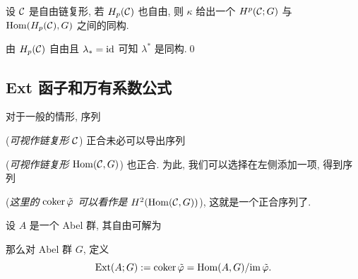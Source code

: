 \begin{Corollary}
	设 $ \mathcal{C} $ 是自由链复形, 若 $ H_p(\mathcal{C}) $ 也自由, 则 $ \kappa $ 给出一个 $ H^p(\mathcal{C};G) $ 与 $ \mathrm{Hom}(H_p(\mathcal{C}),G) $ 之间的同构.
\end{Corollary}
\begin{Proof}
	由 $ H_p(\mathcal{C}) $ 自由且 $ \lambda_*=\mathrm{id} $ 可知 $ \lambda^* $ 是同构.\qed
\end{Proof}

\subsection{Ext 函子和万有系数公式}

对于一般的情形, 序列
\begin{center}
\end{center}
(\textit{可视作链复形 $ \mathcal{C} $}) 正合未必可以导出序列
\begin{center}
\end{center}
(\textit{可视作链复形 $ \mathrm{Hom}(\mathcal{C},G) $}) 也正合. 为此, 我们可以选择在左侧添加一项, 得到序列
\begin{center}
\end{center}
(\textit{这里的 $ \mathrm{coker}\,\tilde{\varphi} $ 可以看作是 $ H^2(\mathrm{Hom}(\mathcal{C},G)) $}), 这就是一个正合序列了.

\begin{Definition}[Ext 函子]
	设 $ A $ 是一个 Abel 群, 其自由可解为
	\begin{center}
	\end{center}
	那么对 Abel 群 $ G $, 定义
	\[
		\mathrm{Ext}(A;G):=\mathrm{coker}\,\tilde\varphi=\mathrm{Hom}(A,G)/\mathrm{im}\,\tilde\varphi.
	\]
\end{Definition}

